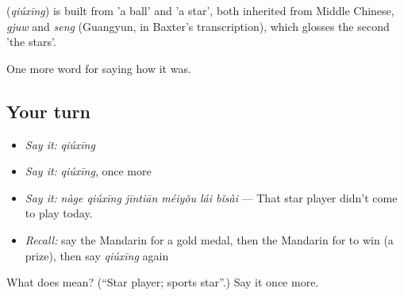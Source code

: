 \begin{cousinweb}
\textbf{} (\emph{qiúxīng}) is built from  'a ball' and  'a star', both inherited from Middle Chinese, \emph{gjuw} and \emph{seng} (Guangyun, in Baxter's transcription), which glosses the second 'the stars'.
\end{cousinweb}

\begin{grammarlens}[title={What you've built}]
One more word for saying how it was.
\end{grammarlens}

\subsection*{Your turn}
\begin{itemize}
\raggedright
  \item \emph{Say it:} \emph{qiúxīng}
  \item \emph{Say it:} \emph{qiúxīng}, once more
  \item \emph{Say it:} \emph{nàge qiúxīng jīntiān méiyǒu lái bǐsài} — That star player didn't come to play today.
  \item \emph{Recall:} say the Mandarin for a gold medal, then the Mandarin for to win (a prize), then say \emph{qiúxīng} again
\end{itemize}

\begin{tcolorbox}[breakable,colback=teal!4,colframe=teal!35!black,title={Before you move on}]
What does  mean? (\textquotedblleft{}Star player; sports star\textquotedblright{}.) Say it once more.
\end{tcolorbox}

